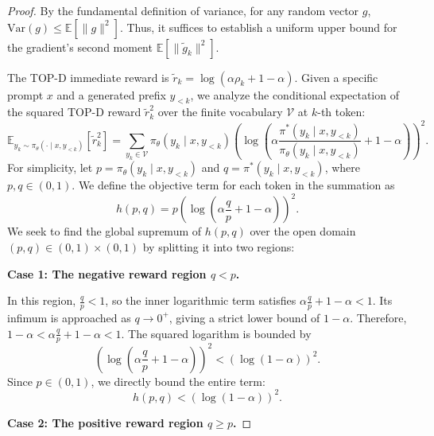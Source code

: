 \documentclass{article}
\theoremstyle{plain}
\theoremstyle{definition}
\theoremstyle{remark}
\begin{document}
\begin{proof}
	By the fundamental definition of variance, for any random vector $g$, $\mathrm{Var}(g)\leq\mathbb{E}\left[\lVert g\rVert^2\right]$. Thus, it suffices to establish a uniform upper bound for the gradient's second moment $\mathbb{E}\left[\lVert\tilde{g}_k\rVert^2\right]$.
	
	The TOP-D immediate reward is $\tilde{r}_k=\log\left(\alpha\rho_k+1-\alpha\right)$. Given a specific prompt $x$ and a generated prefix $y_{<k}$, we analyze the conditional expectation of the squared TOP-D reward $\tilde{r}_k^2$ over the finite vocabulary $\mathcal{V}$ at $k$-th token:
	\begin{equation}
		\mathbb{E}_{y_k \sim \pi_\theta(\cdot \mid x, y_{<k})}\left[\tilde{r}_k^2\right] = \sum_{y_k \in \mathcal{V}} \pi_\theta(y_k \mid x, y_{<k}) \left( \log\left(\alpha \frac{\pi^*(y_k \mid x, y_{<k})}{\pi_\theta(y_k \mid x, y_{<k})} + 1 - \alpha\right) \right)^2.
	\end{equation}
	For simplicity, let $p = \pi_\theta(y_k \mid x, y_{<k})$ and $q = \pi^*(y_k \mid x, y_{<k})$, where $p, q \in (0, 1)$. We define the objective term for each token in the summation as
	\begin{equation}
		h(p, q) = p \left( \log\left(\alpha \frac{q}{p} + 1 - \alpha\right) \right)^2.
	\end{equation}
	We seek to find the global supremum of $h(p, q)$ over the open domain $(p, q) \in (0, 1) \times (0, 1)$ by splitting it into two regions:
	
	\textbf{Case 1: The negative reward region $q < p$.}
	
	In this region, $\frac{q}{p} < 1$, so the inner logarithmic term satisfies $\alpha \frac{q}{p} + 1 - \alpha < 1$. Its infimum is approached as $q \to 0^+$, giving a strict lower bound of $1 - \alpha$. Therefore, $1 - \alpha < \alpha \frac{q}{p} + 1 - \alpha < 1$. The squared logarithm is bounded by
	\begin{equation}
		\left(\log\left(\alpha \frac{q}{p} + 1 - \alpha\right)\right)^2 < \left(\log(1 - \alpha)\right)^2.
	\end{equation}
	Since $p \in (0, 1)$, we directly bound the entire term:
	\begin{equation}
		h(p, q) < (\log(1 - \alpha))^2.
	\end{equation}
	
	\textbf{Case 2: The positive reward region $q \geq p$.}
	

\end{proof}
\end{document}
